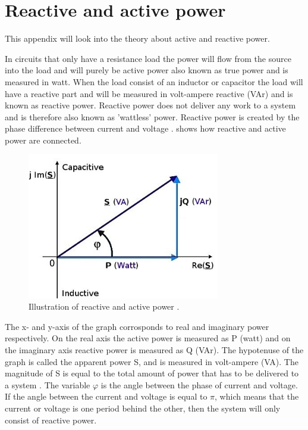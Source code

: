 \section{Reactive and active power}
\label{reactive_and_active_power}

This appendix will look into the theory about active and reactive power.

In circuits that only have a resistance load the power will flow from the source into the load and will purely be active power also known as true power and is measured in watt. When the load consist of an inductor or capacitor the load will have a reactive part and will be measured in volt-ampere reactive (VAr) and is known as reactive power. Reactive power does not deliver any work to a system and is therefore also known as 'wattless' power. Reactive power is created by the phase difference between current and voltage \cite{allaboutcircuits}.  shows how reactive and active power are connected.     

\begin{figure}[H]
\centering
\includegraphics[width=0.75\textwidth]{rapport/billeder/reactive_and_active_power}
\caption{Illustration of reactive and active power \cite{picture_reavtive_active}.}
\label{fig:reactive_and_active_power}
\end{figure}

The x- and y-axis of the graph corrosponds to real and imaginary power respectively. On the real axis the active power is measured as P (watt) and on the imaginary axis reactive power is measured as Q (VAr). The hypotenuse of the graph is called the apparent power S, and is measured in volt-ampere (VA). The magnitude of S is equal to the total amount of power that has to be delivered to a system \cite{allaboutcircuits}.%
The variable $\varphi$ is the angle between the phase of current and voltage. If the angle between the current and voltage is equal to $\pi$, which means that the current or voltage is one period behind the other, then the system will only consist of reactive power. 


